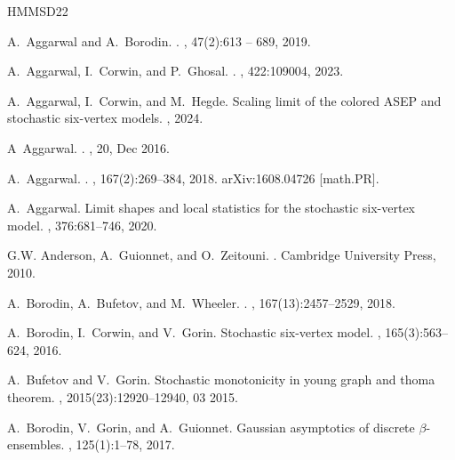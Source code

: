 \documentclass[reqno,11pt]{amsart}
\numberwithin{equation}{section}
\theoremstyle{definition}
\begin{document}

\newcommand{\etalchar}[1]{$^{#1}$}
\begin{thebibliography}{HMMSD22}

A.~Aggarwal and A.~Borodin.
.
, 47(2):613 -- 689, 2019.

A.~Aggarwal, I.~Corwin, and P.~Ghosal.
.
, 422:109004, 2023.

A.~Aggarwal, I.~Corwin, and M.~Hegde.
\newblock Scaling limit of the colored {ASEP} and stochastic six-vertex models.
, 2024.

A~Aggarwal.
.
, 20, Dec 2016.

A.~Aggarwal.
.
, 167(2):269--384, 2018.
\newblock arXiv:1608.04726 [math.PR].

A.~Aggarwal.
\newblock Limit shapes and local statistics for the stochastic six-vertex model.
, 376:681--746, 2020.

G.W. Anderson, A.~Guionnet, and O.~Zeitouni.
.
\newblock Cambridge University Press, 2010.

A.~Borodin, A.~Bufetov, and M.~Wheeler.
.
, 167(13):2457--2529, 2018.

A.~Borodin, I.~Corwin, and V.~Gorin.
\newblock Stochastic six-vertex model.
, 165(3):563--624, 2016.

A.~Bufetov and V.~Gorin.
\newblock Stochastic monotonicity in young graph and thoma theorem.
, 2015(23):12920--12940, 03 2015.

A.~Borodin, V.~Gorin, and A.~Guionnet.
\newblock Gaussian asymptotics of discrete $\beta$-ensembles.
, 125(1):1--78, 2017.


\end{thebibliography}
\end{document}

